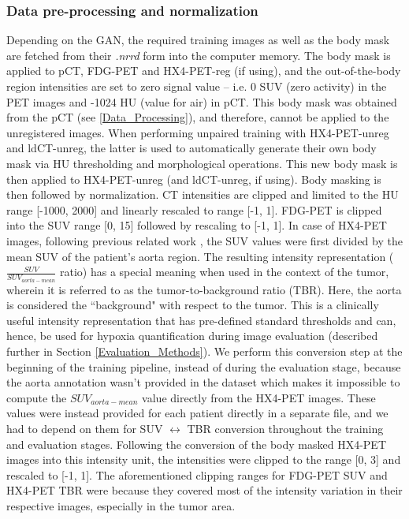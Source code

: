 \subsubsection{Data pre-processing and normalization}
Depending on the GAN, the required training images as well as the body mask are fetched from their \textit{.nrrd} form into the computer memory. The body mask is applied to pCT, FDG-PET and HX4-PET-reg (if using), and the out-of-the-body region intensities are set to zero signal value -- i.e. 0 SUV (zero activity) in the PET images and -1024 HU (value for air) in pCT. This body mask was obtained from the pCT (see \ref{Data_Processing}), and therefore, cannot be applied to the unregistered images. When performing unpaired training with HX4-PET-unreg and ldCT-unreg, the latter is used to automatically generate their own body mask via HU thresholding and morphological operations. This new body mask is then applied to HX4-PET-unreg (and ldCT-unreg, if using). Body masking is then followed by normalization. CT intensities are clipped and limited to the HU range [-1000, 2000] and linearly rescaled to range [-1, 1]. FDG-PET is clipped into the SUV range [0, 15] followed by rescaling to [-1, 1]. In case of HX4-PET images, following previous related work \cite{even2017predicting}, the SUV values were first divided by the mean SUV of the patient's aorta region. The resulting intensity representation ($\frac{SUV}{SUV_{aorta-mean}}$ ratio) has a special meaning when used in the context of the tumor, wherein it is referred to as the tumor-to-background ratio (TBR). Here, the aorta is considered the ``background" with respect to the tumor. This is a clinically useful intensity representation that has pre-defined standard thresholds \cite{zegers2013hypoxia} and can, hence, be used for hypoxia quantification during image evaluation (described further in Section \ref{Evaluation_Methods}). We perform this conversion step at the beginning of the training pipeline, instead of during the evaluation stage, because the aorta annotation wasn't provided in the dataset which makes it impossible to compute the $SUV_{aorta-mean}$ value directly from the HX4-PET images. These values were instead provided for each patient directly in a separate file, and we had to depend on them for SUV $\longleftrightarrow$ TBR conversion throughout the training and evaluation stages. Following the conversion of the body masked HX4-PET images into this intensity unit, the intensities were clipped to the range [0, 3] and rescaled to [-1, 1]. The aforementioned clipping ranges for FDG-PET SUV and HX4-PET TBR were because they covered most of the intensity variation in their respective images, especially in the tumor area.

